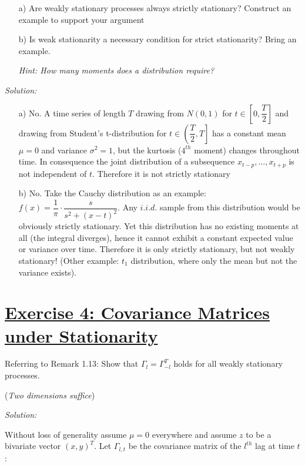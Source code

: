 \documentclass[12pt,a4paper]{article}
\newcommand{\tmpsection}[1]{}
\let\tmpsection=\section
\renewcommand{\section}[1]{\tmpsection{\underline{#1}} }
\begin{document}
\begin{itemize}
    \item[a)] Are weakly stationary processes always strictly stationary? Construct an example to support your argument
    \item[b)] Is weak stationarity a necessary condition for strict stationarity? Bring an example.
    \item[] \textit{Hint: How many moments does a distribution require?}
\end{itemize}

\emph{Solution:}

\begin{itemize}
    \item[a)] No. A time series of length $T$ drawing from $N(0, 1)$ for $t \in \left[0, \dfrac{T}{2} \right]$ and drawing from Student’s t-distribution for $t \in \left(\dfrac{T}{2}, T \right]$ has a constant mean $\mu = 0$ and variance $\sigma^2 = 1$, but the kurtosis ($4^{th}$ moment) changes throughout time. In consequence the joint distribution of a subsequence $x_{t-p}, \ldots , x_{t+p}$ is not independent of $t$. Therefore it is not strictly stationary
    \item[b)] No. Take the Cauchy distribution as an example: $f(x) = \dfrac{1}{\pi} \cdot \dfrac{s}{s^2 + (x -t)^2}$. Any $i.i.d.$ sample from this distribution would be obviously strictly stationary. Yet this distribution has no existing moments at all (the integral diverges), hence it cannot exhibit a constant expected value or variance over time. Therefore it is only strictly stationary, but not weakly stationary! (Other example: $t_1$ distribution, where only the mean but not the variance exists).
\end{itemize}

\hypertarget{exercise-4-covariance-matrices-under-stationarity}{%
\section{Exercise 4: Covariance Matrices under
Stationarity}\label{exercise-4-covariance-matrices-under-stationarity}}

Referring to Remark 1.13: Show that \(\Gamma_l = \Gamma^{T}_{-l}\) holds
for all weakly stationary processes.

(\emph{Two dimensions suffice})

\emph{Solution:}

Without loss of generality assume \(\mu = 0\) everywhere and assume
\(z\) to be a bivariate vector \((x,y)^T\). Let \(\Gamma_{l,t}\) be the
covariance matrix of the \(l^{th}\) lag at time \(t\):
\end{document}
